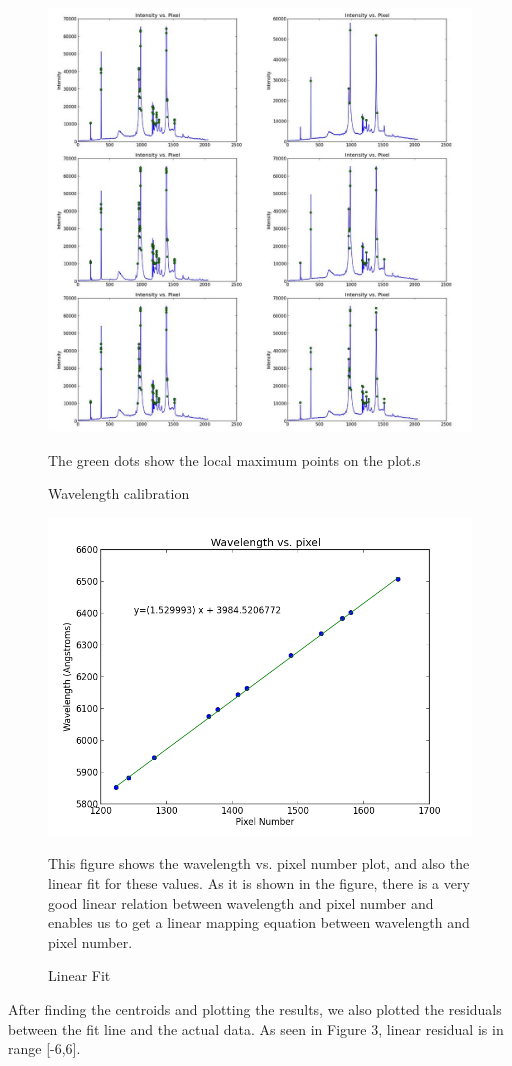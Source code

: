 \documentclass[letterpaper,12pt]{article}
\begin{document}
\begin{figure}[b!]
\centering
\includegraphics[scale=0.3]{mapping1.jpg}
\caption{Wavelength calibration}
The green dots show the local maximum points on the plot.s
\end{figure}



\begin{figure}[t!]
\centering
\includegraphics[scale=0.5]{linear_fit_first.png}
\caption{Linear Fit}
This figure shows the wavelength vs. pixel number plot, and also the linear fit for these values. As it is shown in the figure, there is a very good linear relation between wavelength and pixel number and enables us to get a linear mapping equation between wavelength and pixel number.
\end{figure}
After finding the centroids and plotting the results, we also plotted the residuals between the fit line and the actual data. As seen in Figure 3, linear residual is in range [-6,6].
\end{document}
